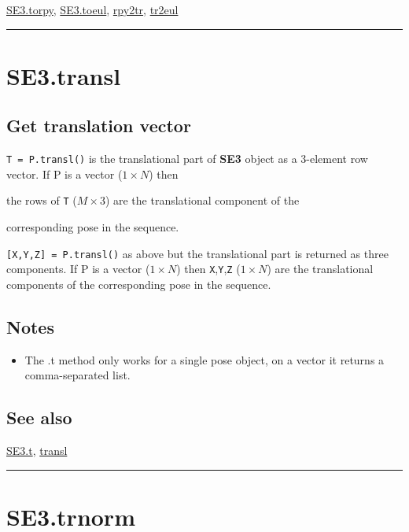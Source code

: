 \hyperlink{SE3.torpy}{\color{blue} SE3.torpy}, \hyperlink{SE3.toeul}{\color{blue} SE3.toeul}, \hyperlink{rpy2tr}{\color{blue} rpy2tr}, \hyperlink{tr2eul}{\color{blue} tr2eul}

\vspace{1.5ex}\hrule

\hypertarget{SE3.transl}{\section*{SE3.transl}}
\subsection*{Get translation vector}


\texttt{T = P.transl()} is the translational part of \textbf{\color{red} SE3} object as a 3-element row
vector.  If P is a vector ($1 \times N$) then



the rows of \texttt{T} ($M \times 3$) are the translational component of the



corresponding pose in the sequence.



\texttt{[X,Y,Z] = P.transl()} as above but the translational part is returned as
three components.  If P is a vector ($1 \times N$) then \texttt{X},\texttt{Y},\texttt{Z} ($1 \times N$) are the
translational components of the corresponding pose in the sequence.


\subsection*{Notes}
\begin{itemize}
  \item The .t method only works for a single pose object, on  a vector it     returns a comma-separated list.
\end{itemize}

\subsection*{See also}


\hyperlink{SE3.t}{\color{blue} SE3.t}, \hyperlink{transl}{\color{blue} transl}

\vspace{1.5ex}\hrule

\hypertarget{SE3.trnorm}{\section*{SE3.trnorm}}
